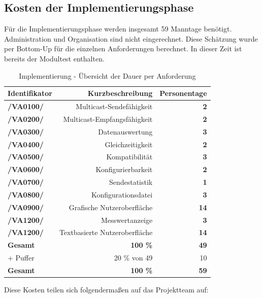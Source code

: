 \subsection{Kosten der Implementierungsphase}

Für die Implementierungsphase werden insgesamt 59 Manntage benötigt.
Administration und Organisation sind nicht eingerechnet. Diese Schätzung wurde
per Bottom-Up für die einzelnen Anforderungen berechnet. In dieser Zeit ist
bereits der Modultest enthalten.

\begin{table}[H]
\caption{Implementierung - Übersicht der Dauer per Anforderung}
\label{tab:kint}
\begin{center}
\begin{tabular}{|l|r|r|}
\hline
\textbf{Identifikator} & \textbf{Kurzbeschreibung} & \textbf{Personentage}\\
\hline
\textbf{/VA0100/} & Multicast-Sendefähigkeit & \textbf{2}\\
\hline
\textbf{/VA0200/} & Multicast-Empfangsfähigkeit & \textbf{2}\\
\hline
\textbf{/VA0300/} & Datenauswertung & \textbf{3}\\
\hline
\textbf{/VA0400/} & Gleichzeitigkeit & \textbf{2}\\
\hline
\textbf{/VA0500/} & Kompatibilität & \textbf{3}\\
\hline
\textbf{/VA0600/} & Konfigurierbarkeit & \textbf{2}\\
\hline
\textbf{/VA0700/} & Sendestatistik & \textbf{1}\\
\hline
\textbf{/VA0800/} & Konfigurationsdatei & \textbf{3}\\
\hline
\textbf{/VA0900/} & Grafische Nutzeroberfläche & \textbf{14}\\
\hline
\textbf{/VA1200/} & Messwertanzeige & \textbf{3}\\
\hline
\textbf{/VA1200/} & Textbasierte Nutzeroberfläche & \textbf{14}\\
\hline
\textbf{Gesamt} & \textbf{100 \%} & \textbf{49}\\
\hline
+ Puffer & 20 \% von 49 & 10\\
\hline
\textbf{Gesamt} & \textbf{100 \%} & \textbf{59}\\
\hline
\end{tabular}
\end{center}
\label{default}
\end{table}

Diese Kosten teilen sich folgendermaßen auf das Projektteam auf:

